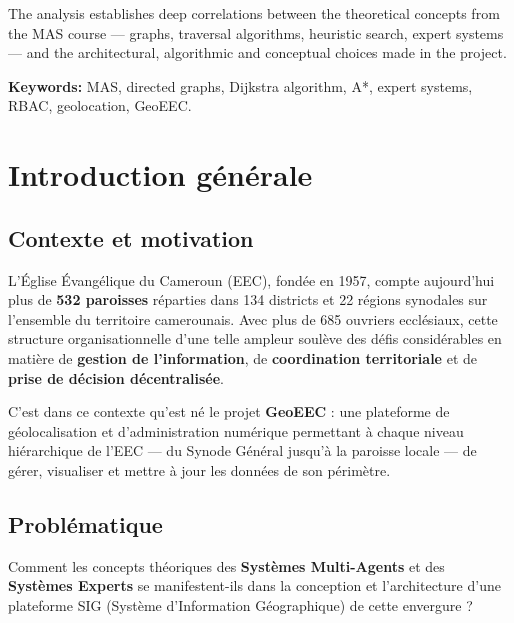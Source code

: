 \documentclass[12pt, a4paper]{report}
\theoremstyle{definition}
\begin{document}
The analysis establishes deep correlations between the theoretical concepts from the MAS course — graphs, traversal algorithms, heuristic search, expert systems — and the architectural, algorithmic and conceptual choices made in the project.

\vspace{0.5cm}
\textbf{Keywords:} MAS, directed graphs, Dijkstra algorithm, A*, expert systems, RBAC, geolocation, GeoEEC.

\tableofcontents

\listoffigures
{}

\chapter{Introduction générale}

\section{Contexte et motivation}

L'Église Évangélique du Cameroun (EEC), fondée en 1957, compte aujourd'hui plus de \textbf{532 paroisses} réparties dans 134 districts et 22 régions synodales sur l'ensemble du territoire camerounais. Avec plus de 685 ouvriers ecclésiaux, cette structure organisationnelle d'une telle ampleur soulève des défis considérables en matière de \textbf{gestion de l'information}, de \textbf{coordination territoriale} et de \textbf{prise de décision décentralisée}.

C'est dans ce contexte qu'est né le projet \textbf{GeoEEC} : une plateforme de géolocalisation et d'administration numérique permettant à chaque niveau hiérarchique de l'EEC — du Synode Général jusqu'à la paroisse locale — de gérer, visualiser et mettre à jour les données de son périmètre.

\section{Problématique}

Comment les concepts théoriques des \textbf{Systèmes Multi-Agents} et des \textbf{Systèmes Experts} se manifestent-ils dans la conception et l'architecture d'une plateforme SIG (Système d'Information Géographique) de cette envergure ?
\end{document}
